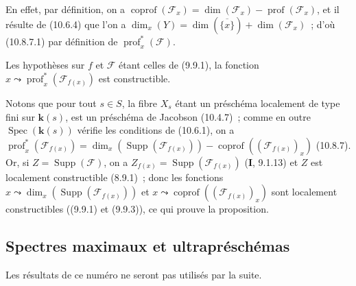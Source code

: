 En effet, par définition, on a
$\operatorname{coprof}(\mathcal F_x)
=\dim(\mathcal F_x)-\operatorname{prof}(\mathcal F_x)$, et il résulte de (10.6.4) que
l'on a $\dim_x(Y)=\dim(\overline{\{x\}})+\dim(\mathcal F_x)$~; d'où (10.8.7.1) par
définition de $\operatorname{prof}^{*}_{x}(\mathcal F)$.

\begin{corollary}[10.8.8]
\label{IV.10.8.8-fr}
Les hypothèses sur $f$ et $\mathcal F$ étant celles de \textup{(9.9.1)}, la fonction
$x\leadsto\operatorname{prof}^{*}_{x}(\mathcal F_{f(x)})$ est constructible.
\end{corollary}

Notons que pour tout $s\in S$, la fibre $X_s$ étant un préschéma localement de
type fini sur $\boldsymbol{k}(s)$, est un préschéma de Jacobson (10.4.7)~; comme en outre
$\operatorname{Spec}(\boldsymbol{k}(s))$ vérifie les conditions de (10.6.1), on a
$\operatorname{prof}^{*}_{x}(\mathcal F_{f(x)})
  =\dim_x(\operatorname{Supp}(\mathcal F_{f(x)}))
  -\operatorname{coprof}((\mathcal F_{f(x)})_x)$
(10.8.7). Or, si $Z=\operatorname{Supp}(\mathcal F)$, on a
$Z_{f(x)}=\operatorname{Supp}(\mathcal F_{f(x)})$ (\textbf{I}, 9.1.13) et $Z$ est
localement constructible (8.9.1)~; donc les fonctions
$x\leadsto\dim_x(\operatorname{Supp}(\mathcal F_{f(x)}))$ et
$x\leadsto\operatorname{coprof}((\mathcal F_{f(x)})_x)$ sont localement
constructibles ((9.9.1) et (9.9.3)), ce qui prouve la proposition.

\subsection{Spectres maximaux et ultrapréschémas}
\label{subsection:IV.10.9-fr}

Les résultats de ce numéro ne seront pas utilisés par la suite.

